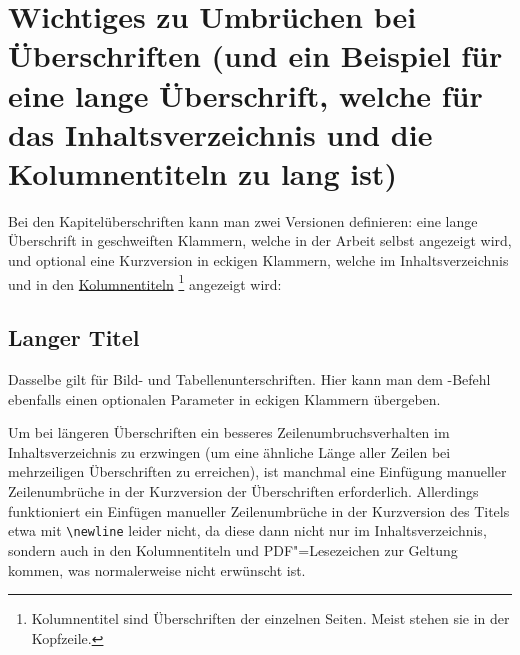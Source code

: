 \section[%
         Wichtiges zu Umbrüchen bei Überschriften
         \mbox{(Kurzversion für das Inhaltsverzeichnis \etc)}%
				]{%
         Wichtiges zu Umbrüchen bei Überschriften
         (und ein Beispiel \newline für eine lange Überschrift,
         welche \newline für das Inhaltsverzeichnis und 
         \newline die Kolumnentiteln zu lang ist)%
				}%
%
\label{sec:Titles}
%
%
Bei den Kapitelüberschriften kann man zwei Versionen definieren:
eine lange Überschrift in geschweiften Klammern, welche in der Arbeit selbst angezeigt wird, 
und optional eine Kurzversion in eckigen Klammern, welche im Inhaltsverzeichnis und in den 
\href{https://de.wikipedia.org/wiki/Kolumnentitel}{Kolumnentiteln}%
\footnote{Kolumnentitel sind Überschriften der einzelnen Seiten. Meist stehen sie in der Kopfzeile.}
angezeigt wird:

\begin{inlinelatex}
\section[Kurzversion]{Langer Titel}
\end{inlinelatex}

Dasselbe gilt für Bild- und Tabellenunterschriften. Hier kann man dem
-Befehl ebenfalls einen optionalen Parameter in eckigen Klammern übergeben.

Um bei längeren Überschriften ein besseres Zeilenumbruchsverhalten im Inhaltsverzeichnis zu erzwingen
(\zB um eine ähnliche Länge aller Zeilen bei mehrzeiligen Überschriften zu erreichen),
ist manchmal eine Einfügung manueller Zeilenumbrüche in der Kurzversion der Überschriften erforderlich.
Allerdings funktioniert ein Einfügen manueller Zeilenumbrüche in der Kurzversion des Titels
etwa mit \verb+\newline+  leider nicht, da diese dann nicht nur im Inhaltsverzeichnis,
sondern auch in den Kolumnentiteln und PDF"=Lesezeichen zur Geltung kommen, 
was normalerweise nicht erwünscht ist.

